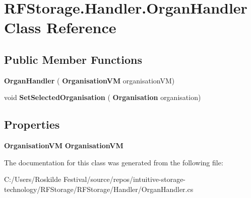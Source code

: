 \section{R\+F\+Storage.\+Handler.\+Organ\+Handler Class Reference}
\label{class_r_f_storage_1_1_handler_1_1_organ_handler}
\subsection*{Public Member Functions}
\begin{DoxyCompactItemize}
\item 
\mbox{\label{class_r_f_storage_1_1_handler_1_1_organ_handler_a07c4561b410d04108aae70058198594d}} 
{\bfseries Organ\+Handler} (\textbf{ Organisation\+VM} organisation\+VM)
\item 
\mbox{\label{class_r_f_storage_1_1_handler_1_1_organ_handler_a59b58722dcd0aaf34938a8754f067c3e}} 
void {\bfseries Set\+Selected\+Organisation} (\textbf{ Organisation} organisation)
\end{DoxyCompactItemize}
\subsection*{Properties}
\begin{DoxyCompactItemize}
\item 
\mbox{\label{class_r_f_storage_1_1_handler_1_1_organ_handler_a0eb6949a3a1c995b365d27596b0533e2}} 
\textbf{ Organisation\+VM} {\bfseries Organisation\+VM}\hspace{0.3cm}{\ttfamily  [get, set]}
\end{DoxyCompactItemize}


The documentation for this class was generated from the following file\+:\begin{DoxyCompactItemize}
\item 
C\+:/\+Users/\+Roskilde Festival/source/repos/intuitive-\/storage-\/technology/\+R\+F\+Storage/\+R\+F\+Storage/\+Handler/Organ\+Handler.\+cs\end{DoxyCompactItemize}
